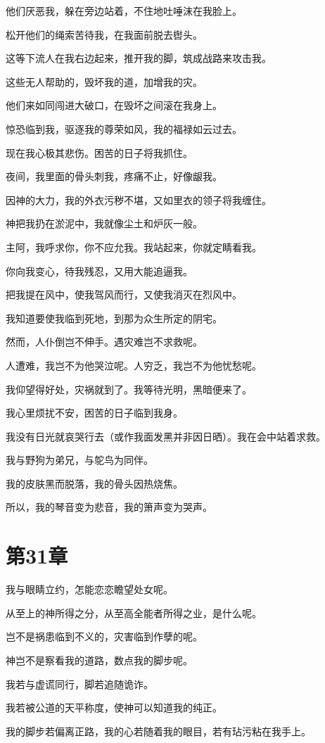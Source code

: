 \documentclass[12pt,oneside]{book}
\begin{document}
他们厌恶我，躲在旁边站着，不住地吐唾沫在我脸上。

松开他们的绳索苦待我，在我面前脱去辔头。

这等下流人在我右边起来，推开我的脚，筑成战路来攻击我。

这些无人帮助的，毁坏我的道，加增我的灾。

他们来如同闯进大破口，在毁坏之间滚在我身上。

惊恐临到我，驱逐我的尊荣如风，我的福禄如云过去。

现在我心极其悲伤。困苦的日子将我抓住。

夜间，我里面的骨头刺我，疼痛不止，好像龈我。

因神的大力，我的外衣污秽不堪，又如里衣的领子将我缠住。

神把我扔在淤泥中，我就像尘土和炉灰一般。

主阿，我呼求你，你不应允我。我站起来，你就定睛看我。

你向我变心，待我残忍，又用大能追逼我。

把我提在风中，使我驾风而行，又使我消灭在烈风中。

我知道要使我临到死地，到那为众生所定的阴宅。

然而，人仆倒岂不伸手。遇灾难岂不求救呢。

人遭难，我岂不为他哭泣呢。人穷乏，我岂不为他忧愁呢。

我仰望得好处，灾祸就到了。我等待光明，黑暗便来了。

我心里烦扰不安，困苦的日子临到我身。

我没有日光就哀哭行去（或作我面发黑并非因日晒）。我在会中站着求救。

我与野狗为弟兄，与鸵鸟为同伴。

我的皮肤黑而脱落，我的骨头因热烧焦。

所以，我的琴音变为悲音，我的箫声变为哭声。


\chapter{第31章}
我与眼睛立约，怎能恋恋瞻望处女呢。

从至上的神所得之分，从至高全能者所得之业，是什么呢。

岂不是祸患临到不义的，灾害临到作孽的呢。

神岂不是察看我的道路，数点我的脚步呢。

我若与虚谎同行，脚若追随诡诈。

我若被公道的天平称度，使神可以知道我的纯正。

我的脚步若偏离正路，我的心若随着我的眼目，若有玷污粘在我手上。
\end{document}
